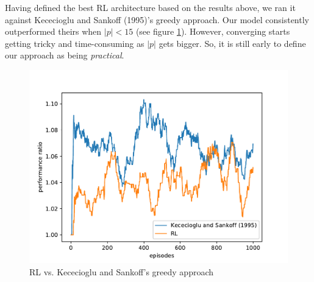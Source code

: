 \documentclass[11pt,twoside]{article}
\begin{document}
Having defined the best RL architecture based on the results above, we ran it against Kececioglu and Sankoff (1995)'s greedy approach. Our model consistently outperformed theirs when $|p| < 15$ (see figure \ref{chart:rl_greedy}). However, converging starts getting tricky and time-consuming as $|p|$ gets bigger. So, it is still early to define our approach as being \textit{practical}. 

\begin{figure}[H]
	\begin{center}
		\includegraphics[scale=0.8]{charts/rl_greedy_comp.pdf}
		\caption{RL vs. Kececioglu and Sankoff's greedy approach}
		\label{chart:rl_greedy}
	\end{center}
\end{figure}



\end{document}
